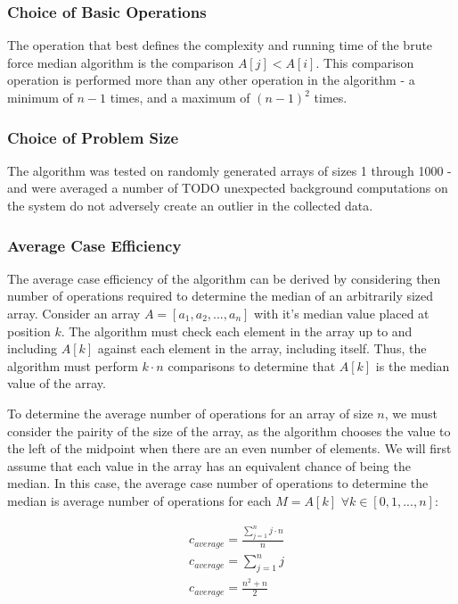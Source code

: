\documentclass{article}
\begin{document}
        \subsubsection{Choice of Basic Operations}
            The operation that best defines the complexity and running time of the brute force median algorithm is the comparison $A[j] < A[i]$. This comparison operation is performed more than any other operation in the algorithm - a minimum of $n - 1$ times, and a maximum of $(n - 1)^2$ times.
        \subsubsection{Choice of Problem Size}
            The algorithm was tested on randomly generated arrays of sizes 1 through 1000 - and were averaged a number of TODO unexpected background computations on the system do not adversely create an outlier in the collected data.

        \subsubsection{Average Case Efficiency}
            The average case efficiency of the algorithm can be derived by considering then number of operations required to determine the median of an arbitrarily sized array. Consider an array $A = [a_1, a_2, ..., a_n]$ with it's median value placed at position $k$. The algorithm must check each element in the array up to and including $A[k]$ against each element in the array, including itself. Thus, the algorithm must perform $k \cdot n$ comparisons to determine that $A[k]$ is the median value of the array.

            To determine the average number of operations for an array of size $n$, we must consider the pairity of the size of the array, as the algorithm chooses the value to the left of the midpoint when there are an even number of elements. We will first assume that each value in the array has an equivalent chance of being the median. In this case, the average case number of operations to determine the median is average number of operations for each $M = A[k]$ $\forall k \in [0, 1, ..., n]$:

            \begin{align}
                & c_{average} = \frac{\sum_{j = 1}^{n} j \cdot n}{n} \\
                & c_{average} = \sum_{j = 1}^n j\\
                & c_{average} = \frac{n^2 + n}{2}
            \end{align}
\end{document}

